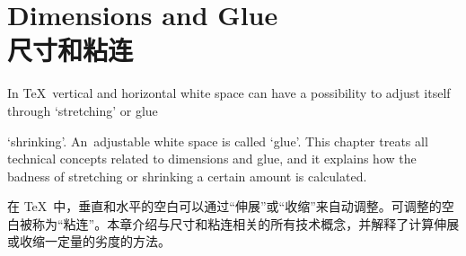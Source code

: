
\endofchapter
\chapter{Dimensions and Glue\\尺寸和粘连}\label{glue}

In \TeX\ vertical and horizontal white space
can have a possibility to adjust itself through `stretching' or
\term glue\par
`shrinking'. An~adjustable white space is called `glue'.
This chapter treats all technical concepts related to
dimensions and glue, and it explains how the badness of stretching or shrinking
a  certain amount is calculated.

在 \TeX\ 中，垂直和水平的空白可以通过“伸展”或“收缩”来自动调整。可调整的空白被称为“粘连”。本章介绍与尺寸和粘连相关的所有技术概念，并解释了计算伸展或收缩一定量的劣度的方法。
